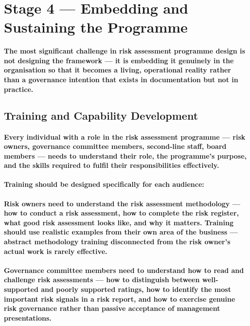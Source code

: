 \section{Stage 4 — Embedding and Sustaining the Programme}
\paragraph{The most significant challenge in risk assessment programme design is not designing the framework — it is embedding it genuinely in the organisation so that it becomes a living, operational reality rather than a governance intention that exists in documentation but not in practice.}

\subsection{Training and Capability Development}
\paragraph{Every individual with a role in the risk assessment programme — risk owners, governance committee members, second-line staff, board members — needs to understand their role, the programme's purpose, and the skills required to fulfil their responsibilities effectively.}
\paragraph{Training should be designed specifically for each audience:}
\paragraph{\textbf{Risk owners} need to understand the risk assessment methodology — how to conduct a risk assessment, how to complete the risk register, what good risk assessment looks like, and why it matters. Training should use realistic examples from their own area of the business — abstract methodology training disconnected from the risk owner's actual work is rarely effective.}
\paragraph{\textbf{Governance committee members} need to understand how to read and challenge risk assessments — how to distinguish between well-supported and poorly supported ratings, how to identify the most important risk signals in a risk report, and how to exercise genuine risk governance rather than passive acceptance of management presentations.}
